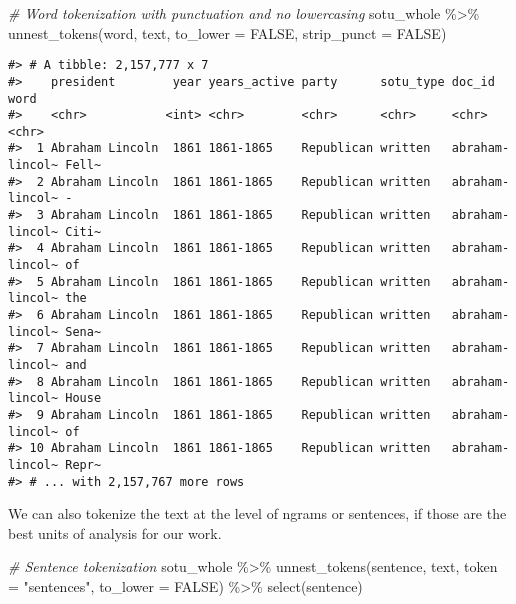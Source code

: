 \documentclass[
]{book}
\newenvironment{Shaded}{\begin{snugshade}}{\end{snugshade}}
\newcommand{\AttributeTok}[1]{\textcolor[rgb]{0.77,0.63,0.00}{#1}}
\newcommand{\CommentTok}[1]{\textcolor[rgb]{0.56,0.35,0.01}{\textit{#1}}}
\newcommand{\ConstantTok}[1]{\textcolor[rgb]{0.00,0.00,0.00}{#1}}
\newcommand{\FunctionTok}[1]{\textcolor[rgb]{0.00,0.00,0.00}{#1}}
\newcommand{\NormalTok}[1]{#1}
\newcommand{\SpecialCharTok}[1]{\textcolor[rgb]{0.00,0.00,0.00}{#1}}
\newcommand{\StringTok}[1]{\textcolor[rgb]{0.31,0.60,0.02}{#1}}
\begin{document}
\begin{Shaded}
\begin{Highlighting}[]
\CommentTok{\# Word tokenization with punctuation and no lowercasing}
\NormalTok{sotu\_whole }\SpecialCharTok{\%\textgreater{}\%}
  \FunctionTok{unnest\_tokens}\NormalTok{(word, text, }\AttributeTok{to\_lower =} \ConstantTok{FALSE}\NormalTok{, }\AttributeTok{strip\_punct =} \ConstantTok{FALSE}\NormalTok{)}
\end{Highlighting}
\end{Shaded}

\begin{verbatim}
#> # A tibble: 2,157,777 x 7
#>    president        year years_active party      sotu_type doc_id          word 
#>    <chr>           <int> <chr>        <chr>      <chr>     <chr>           <chr>
#>  1 Abraham Lincoln  1861 1861-1865    Republican written   abraham-lincol~ Fell~
#>  2 Abraham Lincoln  1861 1861-1865    Republican written   abraham-lincol~ -    
#>  3 Abraham Lincoln  1861 1861-1865    Republican written   abraham-lincol~ Citi~
#>  4 Abraham Lincoln  1861 1861-1865    Republican written   abraham-lincol~ of   
#>  5 Abraham Lincoln  1861 1861-1865    Republican written   abraham-lincol~ the  
#>  6 Abraham Lincoln  1861 1861-1865    Republican written   abraham-lincol~ Sena~
#>  7 Abraham Lincoln  1861 1861-1865    Republican written   abraham-lincol~ and  
#>  8 Abraham Lincoln  1861 1861-1865    Republican written   abraham-lincol~ House
#>  9 Abraham Lincoln  1861 1861-1865    Republican written   abraham-lincol~ of   
#> 10 Abraham Lincoln  1861 1861-1865    Republican written   abraham-lincol~ Repr~
#> # ... with 2,157,767 more rows
\end{verbatim}

We can also tokenize the text at the level of ngrams or sentences, if those are the best units of analysis for our work.

\begin{Shaded}
\begin{Highlighting}[]
\CommentTok{\# Sentence tokenization}
\NormalTok{sotu\_whole }\SpecialCharTok{\%\textgreater{}\%}
  \FunctionTok{unnest\_tokens}\NormalTok{(sentence, text, }\AttributeTok{token =} \StringTok{"sentences"}\NormalTok{, }\AttributeTok{to\_lower =} \ConstantTok{FALSE}\NormalTok{) }\SpecialCharTok{\%\textgreater{}\%} 
  \FunctionTok{select}\NormalTok{(sentence)}
\end{Highlighting}
\end{Shaded}
\end{document}
